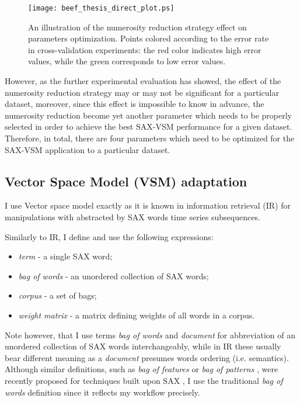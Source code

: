 \begin{figure}[!t]
   \centering
   \texttt{[image: beef\_thesis\_direct\_plot.ps]}
   \caption{
   An illustration of the numerosity reduction strategy effect on parameters optimization. 
   Points colored according to the error rate in cross-validation experiments: the red color indicates high error values, while 
   the green corresponds to low error values. 
   }
   \label{fig:sax_nr}
\end{figure}

However, as the further experimental evaluation has showed, the effect of the numerosity reduction strategy may or may not be 
significant for a particular dataset, moreover, since this effect is impossible to know in advance, the numerosity reduction 
become yet another parameter which needs to be properly selected in order to achieve the best SAX-VSM performance for a 
given dataset. Therefore, in total, there are four parameters which need to be optimized for the SAX-VSM application to a 
particular dataset.



\subsection{Vector Space Model (VSM) adaptation}\label{vsm}
I use Vector space model exactly as it is known in information retrieval (IR) \cite{citeulike:300428} for 
manipulations with abstracted by SAX words time series subsequences. 

Similarly to IR, I define and use the following expressions:
\begin{itemize}
  \item \textit{term} - a single SAX word;
  \item \textit{bag of words} - an unordered collection of SAX words;
  \item \textit{corpus} - a set of bags;
  \item \textit{weight matrix} - a matrix defining weights of all words in a corpus.
\end{itemize}
Note however, that I use terms \textit{bag of words} and \textit{document} for abbreviation of an unordered 
collection of SAX words interchangeably, while in IR these usually bear different meaning as a \textit{document} 
presumes words ordering (i.e. semantics). 
Although similar definitions, such as \textit{bag of features} \cite{citeulike:12636726} 
or \textit{bag of patterns} \cite{citeulike:10525778}, were recently proposed for techniques built 
upon SAX \cite{citeulike:10525778}, I use the traditional \textit{bag of words} definition since it reflects 
my workflow precisely. 

